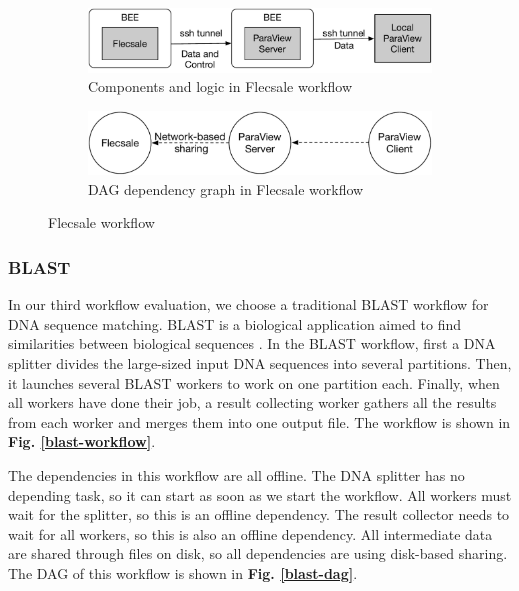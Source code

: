 \begin{figure}
\centering
   \begin{subfigure}[b]{0.4\textwidth}
   \includegraphics[width=0.9\linewidth]{figures/flecsale.pdf}
   \caption{Components and logic in Flecsale workflow}
   \label{flecsale-workflow} 
\end{subfigure}

\begin{subfigure}[b]{0.4\textwidth}
   \includegraphics[width=0.9\linewidth]{figures/flecsale-dag.pdf}
   \caption{DAG dependency graph in Flecsale workflow}
   \label{flecsale-dag}
\end{subfigure}
\caption{Flecsale workflow}
\end{figure}

\subsubsection{BLAST}
In our third workflow evaluation, we choose a traditional BLAST workflow for DNA sequence matching. BLAST is a biological application aimed to find similarities between biological sequences \cite{altschul1990basic}. In the BLAST workflow, first a DNA splitter divides the large-sized input DNA sequences into several partitions. Then, it launches several BLAST workers to work on one partition each. Finally, when all workers have done their job, a result collecting worker gathers all the results from each worker and merges them into one output file. The workflow is shown in \textbf{Fig. \ref{blast-workflow}}.
 
The dependencies in this workflow are all offline. The DNA splitter has no depending task, so it can start as soon as we start the workflow. All workers must wait for the splitter, so this is an offline dependency. The result collector needs to wait for all workers, so this is also an offline dependency. All intermediate data are shared through files on disk, so all dependencies are using disk-based sharing. The DAG of this workflow is shown in \textbf{Fig. \ref{blast-dag}}.

